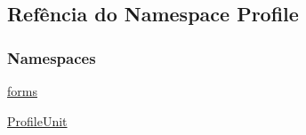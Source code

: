 \hypertarget{namespaceProfile}{\subsection{Refência do Namespace Profile}
\label{namespaceProfile}
}
\subsubsection*{Namespaces}
\begin{DoxyCompactItemize}
\item 
\hyperlink{namespaceProfile_1_1forms}{forms}
\item 
\hyperlink{namespaceProfile_1_1ProfileUnit}{Profile\-Unit}
\end{DoxyCompactItemize}
